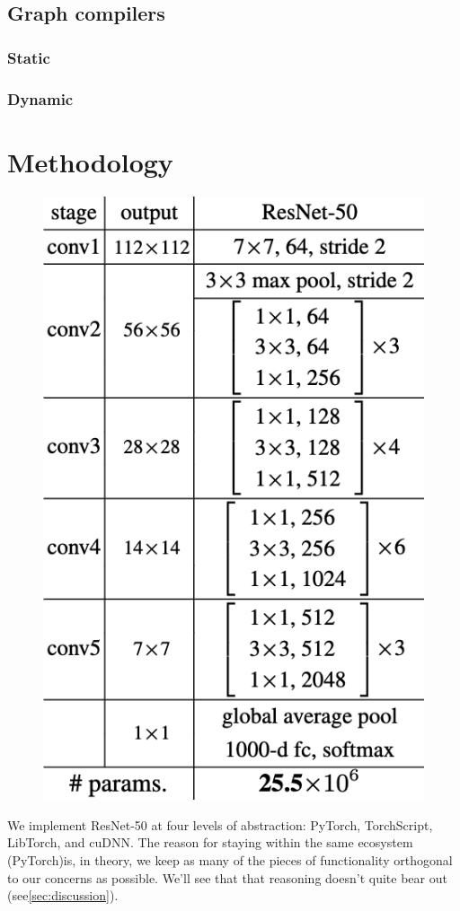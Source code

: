 \documentclass[sigconf]{acmart}
\begin{document}
\subsection{Graph compilers}\label{subsec:graph-compilers}

\subsubsection{Static}

\subsubsection{Dynamic}

\section{Methodology}\label{sec:methodology}

\begin{figure}
  \includegraphics[width=.7\linewidth]{plots/resnet50.png}\label{fig:figure5}
\end{figure}

We implement ResNet-50 at four levels of abstraction: PyTorch, TorchScript, LibTorch, and cuDNN.
The reason for staying within the same ecosystem (PyTorch)is, in theory, we keep as many of the pieces of functionality orthogonal to our concerns as possible.
We'll see that that reasoning doesn't quite bear out (see\ref{sec:discussion}).
\end{document}
